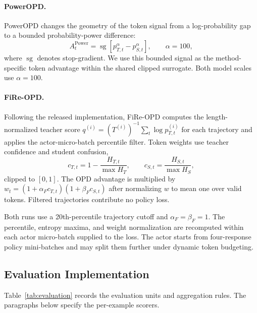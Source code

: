 \paragraph{PowerOPD.}
PowerOPD changes the geometry of the token signal from a log-probability gap to
a bounded probability-power difference:
\begin{equation}
A_t^{\mathrm{Power}}=
\operatorname{sg}\!\left[p_{T,t}^{\alpha}-p_{S,t}^{\alpha}\right],
\qquad \alpha=100,
\label{eq:poweropd}
\end{equation}
where $\operatorname{sg}$ denotes stop-gradient. We use this bounded signal as
the method-specific token advantage within the shared clipped surrogate. Both
model scales use $\alpha=100$.

\paragraph{FiRe-OPD.}
Following the released implementation, FiRe-OPD computes the length-normalized
teacher score $q^{(i)}=(T^{(i)})^{-1}\sum_t\log p_{T,t}^{(i)}$ for each
trajectory and applies the actor-micro-batch percentile filter. Token weights
use teacher confidence and student confusion,
\begin{equation}
c_{T,t}=1-\frac{H_{T,t}}{\max H_T},\qquad
c_{S,t}=\frac{H_{S,t}}{\max H_S},
\end{equation}
clipped to $[0,1]$. The OPD advantage is multiplied by
$w_t=(1+\alpha_F c_{T,t})(1+\beta_F c_{S,t})$ after normalizing $w$ to mean one
over valid tokens. Filtered trajectories contribute no policy loss.

Both runs use a 20th-percentile trajectory cutoff and
$\alpha_F=\beta_F=1$. The percentile, entropy maxima, and weight normalization
are recomputed within each actor micro-batch supplied to the loss. The actor
starts from four-response policy mini-batches and may split them further under
dynamic token budgeting.

\subsection{Evaluation Implementation}

Table~\ref{tab:evaluation} records the evaluation units and aggregation rules.
The paragraphs below specify the per-example scorers.

